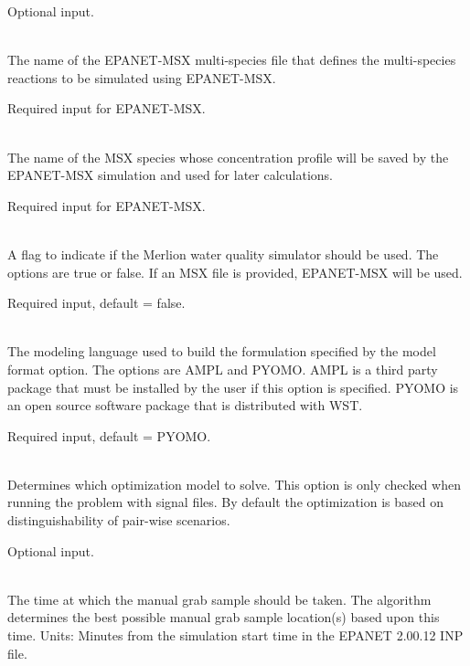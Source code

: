 \begin{description}[topsep=0pt,parsep=0.5em,itemsep=-0.4em]
\begin{description}[topsep=0pt,parsep=0.5em,itemsep=-0.4em]
                Optional input.
    \item[{msx file}]\hfill
\\The name of the EPANET-MSX multi-species file that defines the multi-species reactions to
                be simulated using EPANET-MSX.
                
                Required input for EPANET-MSX.
    \item[{msx species}]\hfill
\\The name of the MSX species whose concentration profile will be saved by the EPANET-MSX simulation
                and used for later calculations.
                
                Required input for EPANET-MSX.
    \item[{merlion}]\hfill
\\A flag to indicate if the Merlion water quality
                simulator should be used. The options are true or false. 
                If an MSX file is provided, EPANET-MSX will be used.
                
                Required input, default = false.
  \end{description}
  \item[{grabsample}]\hfill
  \begin{description}[topsep=0pt,parsep=0.5em,itemsep=-0.4em]
    \item[{model format}]\hfill
\\The modeling language used to build the formulation specified
                by the model format option. The options are AMPL and PYOMO. 
                AMPL is a third party package that must be installed by 
                the user if this option is specified. PYOMO is an open source 
                software package that is distributed with WST.
       
                Required input, default = PYOMO.
    \item[{sample criteria}]\hfill
\\ Determines which optimization model to solve. This option is 
                only checked when running the problem with signal files. By default
                the optimization is based on distinguishability of pair-wise scenarios.
       
                Optional input.
    \item[{sample time}]\hfill
\\The time at which the manual grab sample should be taken. 
                The algorithm determines the best possible manual grab sample location(s)
                based upon this time. Units: Minutes from the simulation start time in the
                EPANET 2.00.12 INP file. 


\end{description}
\end{description}
